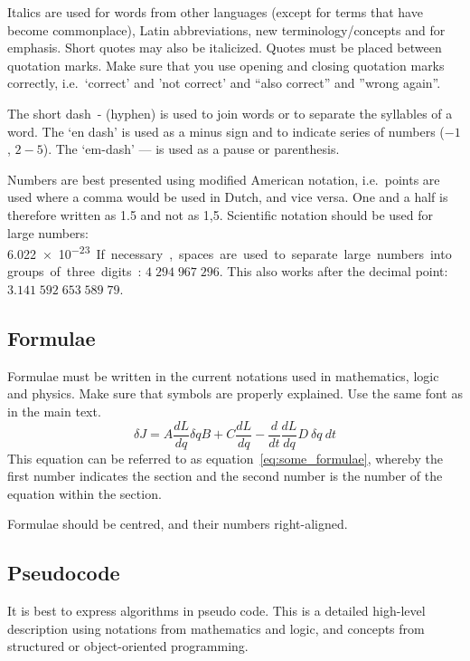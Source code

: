 Italics are used for words from other languages (except for terms that have become commonplace), Latin abbreviations, new terminology/concepts and for emphasis.
Short quotes may also be italicized.
Quotes must be placed between quotation marks.
Make sure that you use opening and closing quotation marks correctly, i.e.\ `correct' and 'not correct' and ``also correct'' and ''wrong again''.

The short dash - (hyphen) is used to join words or to separate the syllables of a word.
The `en dash' is used as a minus sign and to indicate series of numbers ($-1$, $2 - 5$).
The `em-dash' --- is used as a pause or parenthesis.

Numbers are best presented using modified American notation, i.e.\ points are used where a comma would be used in Dutch, and vice versa.
One and a half is therefore written as 1.5 and not as 1,5.
Scientific notation should be used for large numbers: \SI{6.022e-23}.
If necessary, spaces are used to separate large numbers into groups of three digits: $4 \; 294 \; 967 \; 296$.
This also works after the decimal point: $3.141 \; 592 \; 653 \; 589 \; 79$.

\subsection{Formulae}\label{sec:_formulae}
Formulae must be written in the current notations used in mathematics, logic and physics.
Make sure that symbols are properly explained.
Use the same font as in the main text.
\begin{equation}\label{eq:some_formulae}
  \delta J =  A \frac{dL}{dq} \delta q B + C \frac{dL}{dq} - \frac{d}{dt}\frac{dL}{dq} D~\delta q ~dt
\end{equation}
This equation can be referred to as equation~\ref{eq:some_formulae}, whereby the first number indicates the section and the second number is the number of the equation within the section.

Formulae should be centred, and their numbers right-aligned.

\subsection{Pseudocode}\label{sec:_pseudocode}
It is best to express algorithms in pseudo code.
This is a detailed high-level description using notations from mathematics and logic, and concepts from structured or object-oriented programming.

